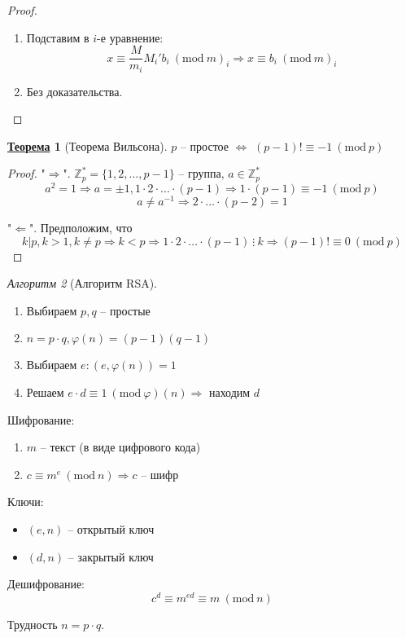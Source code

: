 \documentclass[12pt]{article}
\newenvironment{MyList}[1][4pt]{
  \begin{enumerate}[1.]
  \setlength{\parskip}{0pt}
  \setlength{\itemsep}{#1}
}{       
  \end{enumerate}
}
\newenvironment{MyItemize}[1][4pt]{
  \begin{itemize}
  \setlength{\parskip}{0pt}
  \setlength{\itemsep}{#1}
}{       
  \end{itemize}
}
\def\Z{\mathbb{Z}}       %
\def\SO{\Rightarrow}     %
\def\EQ{\Leftrightarrow} %
\theoremstyle{definition} %
\newtheorem{Thm}{\underline{Теорема}}[subsection] %
\theoremstyle{plain} %
\theoremstyle{remark} %
\newtheorem{Algo}[Thm]{Алгоритм} %
\newcommand{\Mod}[1]{\ (\mathrm{mod}\ #1)}
\begin{document}
\begin{proof}
    \begin{MyList}
        \item Подставим в $i$-е уравнение: 
        \[x \equiv \frac{M}{m_i} M_i' b_i \Mod m_i \SO x \equiv b_i \Mod m_i\]
        \item Без доказательства.
    \end{MyList}
\end{proof}

\begin{Thm}[Теорема Вильсона]
    $p$ -- простое $\EQ$ $(p - 1)! \equiv -1 \Mod p$  
\end{Thm}

\begin{proof}
    "$\SO$". $\Z_p^* = \{1, 2, ..., p - 1\}$ -- группа, $a \in \Z_p^*$
    \[a^2 = 1 \SO a = \pm 1, 1 \cdot 2 \cdot ... \cdot (p - 1) \SO 1 \cdot (p - 1) \equiv -1 \Mod p\]
    \[a \neq a^{-1} \SO 2 \cdot ... \cdot (p - 2) = 1\]
    
    "$\Leftarrow$". Предположим, что $$k | p, k > 1, k \neq p \SO k < p \SO 1 \cdot 2 \cdot ... \cdot (p - 1) \ \vdots \ k \SO (p - 1)! \equiv 0 \Mod p$$ 
\end{proof}

\begin{Algo}[Алгоритм RSA]
    \begin{MyList}
        \item Выбираем $p, q$ -- простые
        \item $n = p \cdot q, \varphi(n) = (p - 1)(q - 1)$
        \item Выбираем $e : (e, \varphi(n)) = 1$
        \item Решаем $e \cdot d \equiv 1 \Mod \varphi(n) \SO$ находим $d$  
    \end{MyList}

    Шифрование:
    \begin{MyList}
        \item $m$ -- текст (в виде цифрового кода)
        \item $c \equiv m^e \Mod n \SO c$ -- шифр
    \end{MyList}

    Ключи:
    \begin{MyItemize}
        \item $(e, n)$ -- открытый ключ
        \item $(d, n)$ -- закрытый ключ
    \end{MyItemize}

    Дешифрование:
    \[c^d \equiv m^{ed} \equiv m \Mod n\]

    Трудность $n = p \cdot q$. 
\end{Algo}
\end{document}
